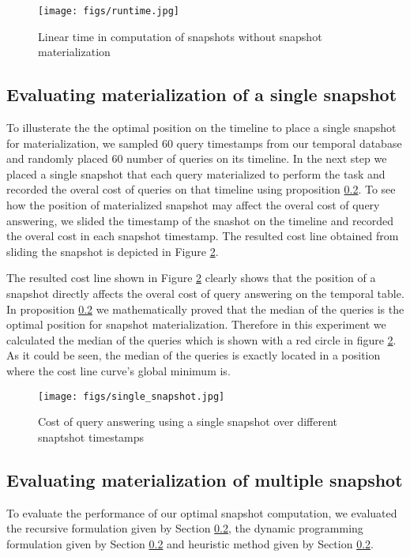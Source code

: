 \begin{figure}
	\label{fig:linear_time}
	\centering
	\texttt{[image: figs/runtime.jpg]}
	\caption{Linear time in computation of snapshots without snapshot materialization}
\end{figure} 

\subsection{Evaluating materialization of a single snapshot}
To illusterate the the optimal position on the timeline to place a single snapshot for materialization, we sampled 60 query timestamps from our temporal database and randomly placed 60 number of queries on its timeline. In the next step we placed a single snapshot that each query materialized to perform the task and recorded the overal cost of queries on that timeline using proposition \ref{}. To see how the position of materialized snapshot may affect the overal cost of query answering, we slided the timestamp of the snashot on the timeline and recorded the overal cost in each snapshot timestamp. The resulted cost line obtained from sliding the snapshot is depicted in Figure \ref{fig:single_snapshot}. 

The resulted cost line shown in Figure \ref{fig:single_snapshot} clearly shows that the position of a snapshot directly affects the overal cost of query answering on the temporal table. In proposition \ref{} we mathematically proved that the median of the queries is the optimal position for snapshot materialization. Therefore in this experiment we calculated the median of the queries which is shown with a red circle in figure \ref{fig:single_snapshot}. As it could be seen, the median of the queries is exactly located in a position where the cost line curve's global minimum is.
\begin{figure}
	\label{fig:single_snapshot}
	\centering
	\texttt{[image: figs/single\_snapshot.jpg]}
	\caption{Cost of query answering using a single snapshot over different snaptshot timestamps}
\end{figure} 

\subsection{Evaluating materialization of multiple snapshot}
To evaluate the performance of our optimal snapshot computation, we evaluated the recursive formulation given
by Section \ref{}, the dynamic programming formulation given by Section \ref{} and heuristic method given by Section \ref{}. 

